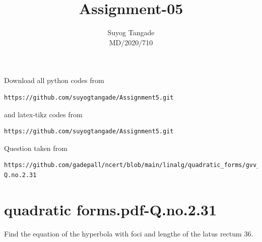 \documentclass[journal,12pt,twocolumn]{IEEEtran}
\begin{document}
\def\rightbox#1{\makebox[0in][r]{#1}}
\def\centbox#1{\makebox[0in]{#1}}
\def\topbox#1{\raisebox{-\baselineskip}[0in][0in]{#1}}
\def\midbox#1{\raisebox{-0.5\baselineskip}[0in][0in]{#1}}
\vspace{3cm}
\title{Assignment-05}
\author{Suyog Tangade\\MD/2020/710}
\maketitle
\newpage
\bigskip
\renewcommand{\thefigure}{\theenumi}
\renewcommand{\thetable}{\theenumi}
Download all python codes from
\begin{lstlisting}
https://github.com/suyogtangade/Assignment5.git
\end{lstlisting}
%
and latex-tikz codes from
%
\begin{lstlisting}
https://github.com/suyogtangade/Assignment5.git
\end{lstlisting}
%
Question taken from
\begin{lstlisting}
https://github.com/gadepall/ncert/blob/main/linalg/quadratic_forms/gvv_ncert_quadratic_forms.pdf-Q.no.2.31
\end{lstlisting}
%
\section{quadratic forms.pdf-Q.no.2.31}
Find the equation of the hyperbola with foci  and lengthe of the latus rectum 36.
\end{document}
